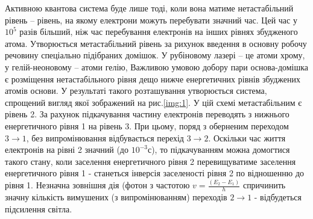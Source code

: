 \documentclass[twocolumn]{el-author}
\begin{document}
Активною квантова система буде лише тоді, коли вона матиме
нетастабільний рівень -- рівень, на якому електрони можуть перебувати
значний час. Цей час у $10^{5}$ разів більший, ніж час перебування електронів на
інших рівнях збудженого атома. Утворюється метастабільний рівень за
рихунок введення в основну робочу речовину спеціально підібраних
домішок. У рубіновому лазері -- це атоми хрому, у гелій-неоновому -- атоми
гелію, Важливою умовою добору пари основа-домішка є розміщення
нетастабільного рівня дещо нижче енергетичних рівнів збуджених атомів
основи. У результаті такого розташування утворюється система, спрощений
вигляд якої зображений на рис.\ref{img:1}. У цій схемі метастабільним є рівень 2. За рахунок підкачування частину електронів переводять з нижнього
енергетичного рівня 1 на рівень 3. При цьому, поряд з оберненим переходом
$3 \to 1$, без випромінювання відбувається перехід $3 \to 2$. Оскільки час життя
електронів на рівні 2 значний (до $10^{-3}$с), то підкачуванням можна домогтися
такого стану, коли заселення енергетичного рівня 2 перевищуватиме
заселення енергетичного рівня 1 - станеться інверсія заселеності рівня 2 по
відношенню до рівня 1. Незначна зовнішня дія (фотон з частотою
$v = \frac{(E_{2} - E_{1})}{h}$ 
спричинить значну кількість вимушених (з випромінюванням)
переходів $2 \to 1$ - відбудеться підсилення світла.

\begin{figure}[h]
\caption{\source{}}
\label{img:2}
\end{figure}
\end{document}
